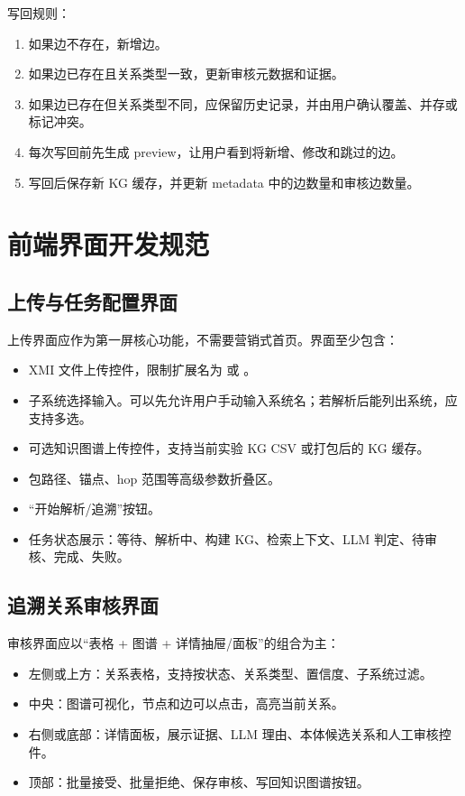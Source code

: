 \documentclass[11pt,a4paper]{article}
\newcommand{\code}[1]{\texttt{\detokenize{#1}}}
\begin{document}
写回规则：
\begin{enumerate}
  \item 如果边不存在，新增边。
  \item 如果边已存在且关系类型一致，更新审核元数据和证据。
  \item 如果边已存在但关系类型不同，应保留历史记录，并由用户确认覆盖、并存或标记冲突。
  \item 每次写回前先生成 preview，让用户看到将新增、修改和跳过的边。
  \item 写回后保存新 KG 缓存，并更新 metadata 中的边数量和审核边数量。
\end{enumerate}

\section{前端界面开发规范}

\subsection{上传与任务配置界面}

上传界面应作为第一屏核心功能，不需要营销式首页。界面至少包含：
\begin{itemize}
  \item XMI 文件上传控件，限制扩展名为 \code{.xmi} 或 \code{.xml}。
  \item 子系统选择输入。可以先允许用户手动输入系统名；若解析后能列出系统，应支持多选。
  \item 可选知识图谱上传控件，支持当前实验 KG CSV 或打包后的 KG 缓存。
  \item 包路径、锚点、hop 范围等高级参数折叠区。
  \item “开始解析/追溯”按钮。
  \item 任务状态展示：等待、解析中、构建 KG、检索上下文、LLM 判定、待审核、完成、失败。
\end{itemize}

\subsection{追溯关系审核界面}

审核界面应以“表格 + 图谱 + 详情抽屉/面板”的组合为主：
\begin{itemize}
  \item 左侧或上方：关系表格，支持按状态、关系类型、置信度、子系统过滤。
  \item 中央：图谱可视化，节点和边可以点击，高亮当前关系。
  \item 右侧或底部：详情面板，展示证据、LLM 理由、本体候选关系和人工审核控件。
  \item 顶部：批量接受、批量拒绝、保存审核、写回知识图谱按钮。
\end{itemize}
\end{document}
